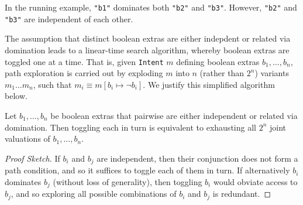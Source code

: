 In the running example, {\tt "b1"} dominates both {\tt "b2"} and {\tt "b3"}. However, {\tt "b2"} and {\tt "b3"} are independent of each other.

The assumption that distinct boolean extras are either indepdent or related via domination leads to a linear-time search algorithm, whereby boolean extras are toggled one at a time. That is, given {\tt Intent}  $m$ defining boolean extras $b_1,\ldots,b_n$, path exploration is carried out by exploding $m$ into $n$ (rather than $2^n$) variants $m_1 \ldots m_n$, such that $m_i \equiv m[ b_i \mapsto \neg b_i ]$. We justify this simplified algorithm below.

\begin{lemma} Let $b_1,\ldots,b_n$ be boolean extras that pairwise are either independent or related via domination. Then toggling each in turn is equivalent to exhausting all $2^n$ joint valuations of $b_1,\ldots,b_n$.
\begin{proof}[Proof Sketch]
If $b_i$ and $b_j$ are independent, then their conjunction does not form a path condition, and so it suffices to toggle each of them in turn. If alternatively $b_i$ dominates $b_j$ (without loss of generality), then toggling $b_i$ would obviate access to $b_j$, and so exploring all possible combinations of $b_i$ and $b_j$ is redundant.
\end{proof}
\end{lemma}




